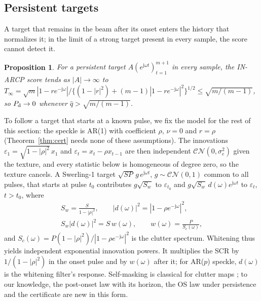 \documentclass[journal]{IEEEtran}
\newtheorem{proposition}{Proposition}
\begin{document}
\subsection{Persistent targets}
A target that remains in the beam after its onset enters the history that normalizes it; in the limit of a strong target present in every sample, the score cannot detect it.
\begin{proposition}\label{prop:blind}
For a persistent target $A(e^{\mathrm j\omega t})_{t=1}^{m+1}$ in every sample, the IN-ARCP score tends as $|A|\to\infty$ to $T_\infty=\sqrt m|1-re^{-\mathrm j\omega}|/\{(1-|r|^2)+(m-1)|1-re^{-\mathrm j\omega}|^2\}^{1/2}\le\sqrt{m/(m-1)}$, so $P_{\rm d}\to0$ whenever $\widehat q>\sqrt{m/(m-1)}$.
\end{proposition}
To follow a target that starts at a known pulse, we fix the model for the rest of this section: the speckle is AR(1) with coefficient $\rho$, $\nu=0$ and $r=\rho$ (Theorem~\ref{thm:cert} needs none of these assumptions). The innovations $\varepsilon_1=\sqrt{1-|\rho|^2}\,x_1$ and $\varepsilon_t=x_t-\rho x_{t-1}$ are then independent $\mathcal{CN}(0,\sigma_e^2)$ given the texture, and every statistic below is homogeneous of degree zero, so the texture cancels. A Swerling-1 target $\sqrt{SP}\,g\,e^{\mathrm j\omega t}$, $g\sim\mathcal{CN}(0,1)$ common to all pulses, that starts at pulse $t_0$ contributes $g\sqrt{S_w}$ to $\varepsilon_{t_0}$ and $g\sqrt{S_w}\,d(\omega)e^{\mathrm j\omega t}$ to $\varepsilon_t$, $t>t_0$, where
\begin{equation}
\begin{gathered}
S_w=\frac{S}{1-|\rho|^2},\qquad |d(\omega)|^2=|1-\rho e^{-\mathrm j\omega}|^2,\\
S_w|d(\omega)|^2=S\,w(\omega),\qquad w(\omega)=\frac{P}{S_c(\omega)},
\end{gathered}
\label{eq:whitenedscr}
\end{equation}
and $S_c(\omega)=P(1-|\rho|^2)/|1-\rho e^{-\mathrm j\omega}|^2$ is the clutter spectrum. Whitening thus yields independent exponential innovation powers. It multiplies the SCR by $1/(1-|\rho|^2)$ in the onset pulse and by $w(\omega)$ after it; for AR($p$) speckle, $d(\omega)$ is the whitening filter's response. Self-masking is classical for clutter maps \cite{lops1989,naldi1999}; to our knowledge, the post-onset law with its horizon, the OS law under persistence and the certificate are new in this form.
\end{document}
